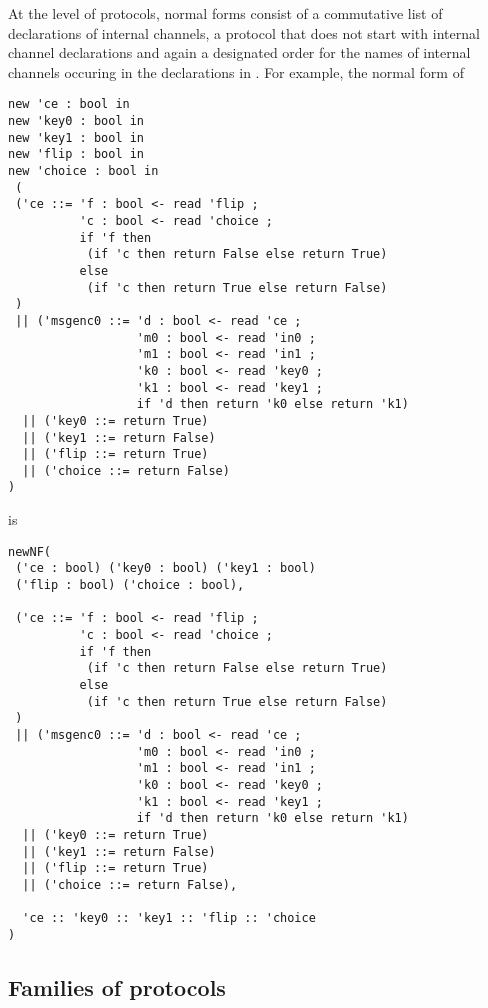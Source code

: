 At the level of protocols, normal forms  
consist of a commutative list  of declarations of internal
channels, a protocol  that does not start with internal channel declarations
and again a designated order  
for the names of internal channels occuring in the declarations in 
.
For example, the normal form of
\begin{lstlisting}
new 'ce : bool in 
new 'key0 : bool in 
new 'key1 : bool in 
new 'flip : bool in 
new 'choice : bool in
 (
 ('ce ::= 'f : bool <- read 'flip ;
          'c : bool <- read 'choice ;
          if 'f then 
           (if 'c then return False else return True)
          else 
           (if 'c then return True else return False)
 )
 || ('msgenc0 ::= 'd : bool <- read 'ce ;
                  'm0 : bool <- read 'in0 ; 
                  'm1 : bool <- read 'in1 ;
                  'k0 : bool <- read 'key0 ;
                  'k1 : bool <- read 'key1 ;
                  if 'd then return 'k0 else return 'k1)
  || ('key0 ::= return True) 
  || ('key1 ::= return False)
  || ('flip ::= return True) 
  || ('choice ::= return False) 
)
\end{lstlisting}
\noindent is
\begin{lstlisting}
newNF(
 ('ce : bool) ('key0 : bool) ('key1 : bool)
 ('flip : bool) ('choice : bool),
 
 ('ce ::= 'f : bool <- read 'flip ;
          'c : bool <- read 'choice ;
          if 'f then 
           (if 'c then return False else return True)
          else 
           (if 'c then return True else return False)
 )
 || ('msgenc0 ::= 'd : bool <- read 'ce ;
                  'm0 : bool <- read 'in0 ; 
                  'm1 : bool <- read 'in1 ;
                  'k0 : bool <- read 'key0 ;
                  'k1 : bool <- read 'key1 ;
                  if 'd then return 'k0 else return 'k1)
  || ('key0 ::= return True) 
  || ('key1 ::= return False)
  || ('flip ::= return True) 
  || ('choice ::= return False),
  
  'ce :: 'key0 :: 'key1 :: 'flip :: 'choice
)
\end{lstlisting}

\subsection{Families of protocols}

